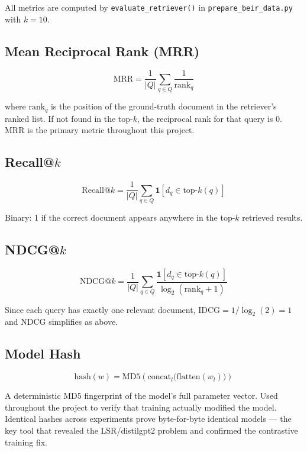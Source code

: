\documentclass[12pt,a4paper]{article}
\begin{document}
All metrics are computed by \texttt{evaluate\_retriever()} in \texttt{prepare\_beir\_data.py} with $k=10$.

\subsection{Mean Reciprocal Rank (MRR)}

\begin{equation}
  \text{MRR} = \frac{1}{|Q|} \sum_{q \in Q} \frac{1}{\text{rank}_q}
\end{equation}

where $\text{rank}_q$ is the position of the ground-truth document in the retriever's ranked list. If not found in the top-$k$, the reciprocal rank for that query is 0. MRR is the primary metric throughout this project.

\subsection{Recall@$k$}

\begin{equation}
  \text{Recall}@k = \frac{1}{|Q|} \sum_{q \in Q} \mathbf{1}[d_q \in \text{top-}k(q)]
\end{equation}

Binary: 1 if the correct document appears anywhere in the top-$k$ retrieved results.

\subsection{NDCG@$k$}

\begin{equation}
  \text{NDCG}@k = \frac{1}{|Q|} \sum_{q \in Q} \frac{\mathbf{1}[d_q \in \text{top-}k(q)]}{\log_2(\text{rank}_q + 1)}
\end{equation}

Since each query has exactly one relevant document, IDCG$=1/\log_2(2)=1$ and NDCG simplifies as above.

\subsection{Model Hash}

\begin{equation}
  \text{hash}(w) = \text{MD5}\!\left(\text{concat}_{l}\bigl(\text{flatten}(w_l)\bigr)\right)
\end{equation}

A deterministic MD5 fingerprint of the model's full parameter vector. Used throughout the project to verify that training actually modified the model. Identical hashes across experiments prove byte-for-byte identical models --- the key tool that revealed the LSR/distilgpt2 problem and confirmed the contrastive training fix.
\end{document}
